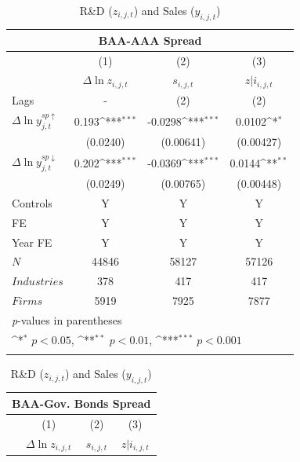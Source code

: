 \documentclass{_latex/house}
\begin{document}
\begin{table}[h]\footnotesize
\caption{R\&D ($z_{i,j,t}$) and Sales ($y_{i,j,t}$)}
\begin{center}
{
\def\sym#1{\ifmmode^{#1}\else\(^{#1}\)\fi}
\begin{tabular}{l*{3}{c}}
            \multicolumn{4}{c}{BAA-AAA Spread} \\
\hline\hline
            &\multicolumn{1}{c}{(1)}&\multicolumn{1}{c}{(2)}&\multicolumn{1}{c}{(3)}\\
            &\multicolumn{1}{c}{$\Delta \ln{z_{i,j,t}}$}&\multicolumn{1}{c}{$s_{i,j,t}$}&\multicolumn{1}{c}{$z|i_{i,j,t}$}\\
\hline
Lags & - & (2) & (2) \\
$\Delta\ln{y_{j,t}^{sp \uparrow}}$ & 0.193\sym{***}&     -0.0298\sym{***}&      0.0102\sym{*}  \\
            &    (0.0240)         &   (0.00641)         &   (0.00427)         \\
[1em]
$\Delta\ln{y_{j,t}^{sp \downarrow}}$ &       0.202\sym{***}&     -0.0369\sym{***}&      0.0144\sym{**} \\
            &    (0.0249)         &   (0.00765)         &   (0.00448)         \\
Controls & Y & Y & Y \\
FE & Y & Y & Y \\
Year FE & Y & Y & Y \\
\hline
\(N\)       &       44846         &       58127         &       57126         \\
\(Industries\)      &       378         &       417         &       417             \\
\(Firms\)      &       5919         &       7925          &       7877        \\
\hline\hline
\multicolumn{4}{l}{\footnotesize \textit{p}-values in parentheses}\\
\multicolumn{4}{l}{\footnotesize \sym{*} \(p<0.05\), \sym{**} \(p<0.01\), \sym{***} \(p<0.001\)}\\
\label{tab:table14}
\end{tabular}
\:
\begin{tabular}{l*{3}{c}}
            \multicolumn{4}{c}{BAA-Gov. Bonds Spread} \\
\hline\hline
            &\multicolumn{1}{c}{(1)}&\multicolumn{1}{c}{(2)}&\multicolumn{1}{c}{(3)}\\
            &\multicolumn{1}{c}{$\Delta \ln{z_{i,j,t}}$}&\multicolumn{1}{c}{$s_{i,j,t}$}&\multicolumn{1}{c}{$z|i_{i,j,t}$}\\

\end{tabular}}
\end{center}
\end{table}
\end{document}
